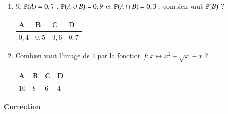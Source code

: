 \documentclass[oneside,12pt]{exam}          %
\begin{document}
\begin{enumerate}[label=\underline{Question \no\arabic*} :  , leftmargin=* , itemsep=5mm]
		

	\item Si ${\mathbb P}(A) = 0,7$ , ${\mathbb P}(A \cup B) = 0,9$ et ${\mathbb P}(A \cap B) = 0,3$ , combien vaut ${\mathbb P}(B)$ ?
	
		\hspace{\linewidth-\textwidth}
		\renewcommand{\arraystretch}{1.5}
		\begin{tabular}{| P{0.22\textwidth} | P{0.22\textwidth} | P{0.22\textwidth} | P{0.22\textwidth} |} \hline
			A & B & C & D \\ \hline
			$0,4$ & $0,5$ & $0,6$ & $0,7$ \\ \hline
		\end{tabular}
		
		

	\item Combien vaut l'image de $4$ par la fonction $f : x \mapsto x^2 - \sqrt{x} - x$ ?
	
		\hspace{\linewidth-\textwidth}
		\renewcommand{\arraystretch}{1.5}
		\begin{tabular}{| P{0.22\textwidth} | P{0.22\textwidth} | P{0.22\textwidth} | P{0.22\textwidth} |} \hline
			A & B & C & D \\ \hline
			$10$ & $8$ & $6$ & $4$ \\ \hline
		\end{tabular}	
		
\end{enumerate}



\newpage
{}
\color{newblue}

\begin{center}
	\textbf{\underline{\Large Correction} }
\end{center}
\end{document}
